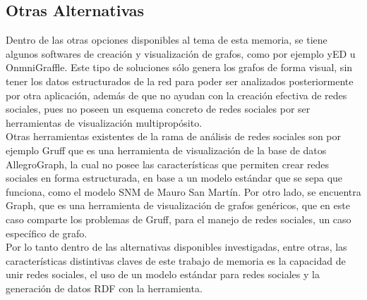 
\subsection{Otras Alternativas} %
\label{sub:otras_alternativas}


Dentro de las otras opciones disponibles al tema de esta memoria, se tiene algunos softwares de creación y visualización de grafos, como por ejemplo yED\cite{yed} u OnmniGraffle\cite{omnigraffle}. Este tipo de soluciones sólo genera los grafos de forma visual, sin tener los datos estructurados de la red para poder ser analizados posteriormente por otra aplicación, además de que no ayudan con la creación efectiva de redes sociales, pues no poseen un esquema concreto de redes sociales por ser herramientas de visualización multipropósito.\\

Otras herramientas existentes de la rama de análisis de redes sociales son por ejemplo Gruff\cite{gruff} que es una herramienta de visualización de la base de datos AllegroGraph\cite{allegrograph}, la cual no posee las características que permiten crear redes sociales en forma estructurada, en base a un modelo estándar que se sepa que funciona, como el modelo SNM de Mauro San Martín\cite{tesismauro}. Por otro lado, se encuentra Graph\cite{graph}, que es una herramienta de visualización de grafos genéricos, que en este caso comparte los problemas de Gruff, para el manejo de redes sociales, un caso específico de grafo.\\

Por lo tanto dentro de las alternativas disponibles investigadas, entre otras, las características distintivas claves de este trabajo de memoria es la capacidad de unir redes sociales, el uso de un modelo estándar para redes sociales y la generación de datos RDF con la herramienta.



%   
% 

% 
